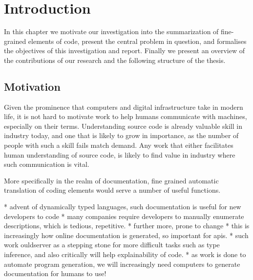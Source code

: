 \chapter{Introduction}
\label{chapterlabel1}




In this chapter we motivate our investigation into the summarization of fine-grained elements of code, present the central problem in question, and formalises the objectives of this investigation and report. 
Finally we present an overview of the contributions of our research and the following structure of the thesis.



\section{Motivation} %
\label{sec:motivation}

Given the prominence that computers and digital infrastructure take in modern life, it is not hard to motivate work to help humans communicate with machines, especially on their terms.
Understanding source code is already valuable skill in industry today, and one that is likely to grow in importance, as the number of people with such a skill fails match demand. 
Any work that either facilitates human understanding of source code, is likely to find value in industry where such communication is vital.

More specifically in the realm of documentation, fine grained automatic translation of coding elements would serve a number of useful functions. 

* advent of dynamically typed languages, such documentation is useful for new developers to code
* many companies require developers to manually enumerate descriptions, which is tedious, repetitive.
* further more, prone to change
* this is increasingly  how online documentation is generated, so important for apis.
* such work ouldserver as a stepping stone for more difficult tasks such as type inference, and also critically will help explainability of code.
* as work is done to automate program generation, we will increasingly need computers to generate documentation for humans to use!





